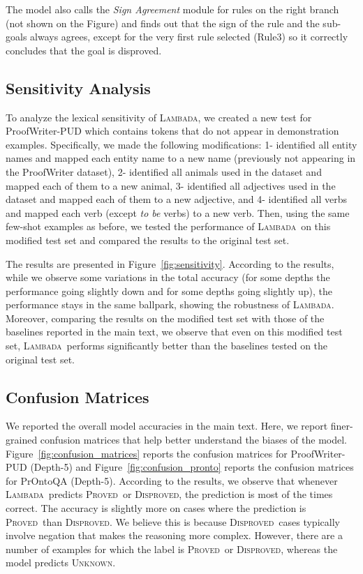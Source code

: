 \documentclass[11pt]{article}
\newcommand{\algo}{\textsc{Lambada}}
\newcommand{\proved}{\textsc{Proved}}
\newcommand{\disproved}{\textsc{Disproved}}
\newcommand{\unk}{\textsc{Unknown}}
\newcommand{\module}[1]{\emph{#1}}
\begin{document}
The model also calls the \module{Sign Agreement} module for rules on the right branch (not shown on the Figure) and finds out that the sign of the rule and the sub-goals always agrees, except for the very first rule selected (Rule3) so it correctly concludes that the goal is disproved.

\subsection{Sensitivity Analysis} \label{sec:sensitivity}
To analyze the lexical sensitivity of \algo, we created a new test for ProofWriter-PUD which contains tokens that do not appear in demonstration examples. Specifically, we made the following modifications: 1- identified all entity names and mapped each entity name to a new name (previously not appearing in the ProofWriter dataset), 2- identified all animals used in the dataset and mapped each of them to a new animal, 3- identified all adjectives used in the dataset and mapped each of them to a new adjective, and 4- identified all verbs and mapped each verb (except \emph{to be} verbs) to a new verb. Then, using the same few-shot examples as before, we tested the performance of \algo\ on this modified test set and compared the results to the original test set.

The results are presented in Figure~\ref{fig:sensitivity}. According to the results, while we observe some variations in the total accuracy (for some depths the performance going slightly down and for some depths going slightly up), the performance stays in the same ballpark, showing the robustness of \algo. Moreover, comparing the results on the modified test set with those of the baselines reported in the main text, we observe that even on this modified test set, \algo\ performs significantly better than the baselines tested on the original test set.


\subsection{Confusion Matrices} \label{sec:confusion-matrix}
We reported the overall model accuracies in the main text. Here, we report finer-grained confusion matrices that help better understand the biases of the model. Figure~\ref{fig:confusion_matrices} reports the confusion matrices for ProofWriter-PUD (Depth-5) and Figure~\ref{fig:confusion_pronto} reports the confusion matrices for PrOntoQA (Depth-5). According to the results, we observe that whenever \algo\ predicts \proved\ or \disproved, the prediction is most of the times correct. The accuracy is slightly more on cases where the prediction is \proved\ than \disproved. We believe this is because \disproved\ cases typically involve negation that makes the reasoning more complex. However, there are a number of examples for which the label is \proved\ or \disproved, whereas the model predicts \unk.
\end{document}
